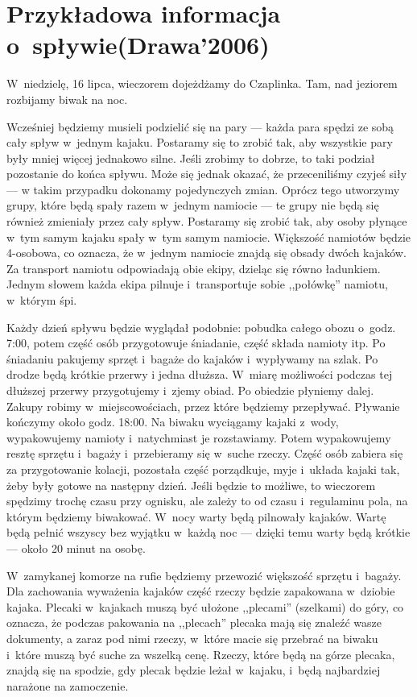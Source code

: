 \section{Przykładowa informacja o~spływie\newline (Drawa'2006)\label{info-o-splywie}}
W~niedzielę, 16 lipca, wieczorem dojeżdżamy do Czaplinka. Tam, nad jeziorem rozbijamy biwak na noc.

Wcześniej będziemy musieli podzielić się na pary --- każda para spędzi ze sobą cały spływ w~jednym kajaku. Postaramy się to zrobić tak, aby wszystkie pary były mniej więcej jednakowo silne. Jeśli zrobimy to dobrze, to taki podział pozostanie do końca spływu. Może się jednak okazać, że przeceniliśmy czyjeś siły --- w takim przypadku dokonamy pojedynczych zmian. Oprócz tego utworzymy grupy, które będą spały razem w~jednym namiocie --- te grupy nie będą się również zmieniały przez cały spływ. Postaramy się zrobić tak, aby osoby płynące w~tym samym kajaku spały w~tym samym namiocie. Większość namiotów będzie 4-osobowa, co oznacza, że w~jednym namiocie znajdą się obsady dwóch kajaków. Za transport namiotu odpowiadają obie ekipy, dzieląc się równo ładunkiem. Jednym słowem każda ekipa pilnuje i~transportuje sobie ,,połówkę'' namiotu, w~którym śpi.

Każdy dzień spływu będzie wyglądał podobnie: pobudka całego obozu o~godz. 7:00, potem część osób przygotowuje śniadanie, część składa namioty itp. Po śniadaniu pakujemy sprzęt i~bagaże do kajaków i~wypływamy na szlak. Po drodze będą krótkie przerwy i jedna dłuższa. W~miarę możliwości podczas tej dłuższej przerwy przygotujemy i~zjemy obiad. Po obiedzie płyniemy dalej. Zakupy robimy w~miejscowościach, przez które będziemy przepływać. Pływanie kończymy około godz. 18:00. Na biwaku wyciągamy kajaki z~wody, wypakowujemy namioty i~natychmiast je rozstawiamy. Potem wypakowujemy resztę sprzętu i~bagaży i~przebieramy się w~suche rzeczy. Część osób zabiera się za przygotowanie kolacji, pozostała część porządkuje, myje i~układa kajaki tak, żeby były gotowe na następny dzień. Jeśli będzie to możliwe, to wieczorem spędzimy trochę czasu przy ognisku, ale zależy to od czasu i~regulaminu pola, na którym będziemy biwakować. W~nocy warty będą pilnowały kajaków. Wartę będą pełnić wszyscy bez wyjątku w~każdą noc --- dzięki temu warty będą krótkie --- około 20 minut na osobę.

W~zamykanej komorze na rufie będziemy przewozić większość sprzętu i~bagaży. Dla zachowania wyważenia kajaków część rzeczy będzie zapakowana w~dziobie kajaka. Plecaki w~kajakach muszą być ułożone ,,plecami'' (szelkami) do góry, co oznacza, że podczas pakowania na ,,plecach'' plecaka mają się znaleźć wasze dokumenty, a zaraz pod nimi rzeczy, w~które macie się przebrać na biwaku i~które muszą być suche za wszelką cenę. Rzeczy, które będą na górze plecaka, znajdą się na spodzie, gdy plecak będzie leżał w~kajaku, i~będą najbardziej narażone na zamoczenie.

